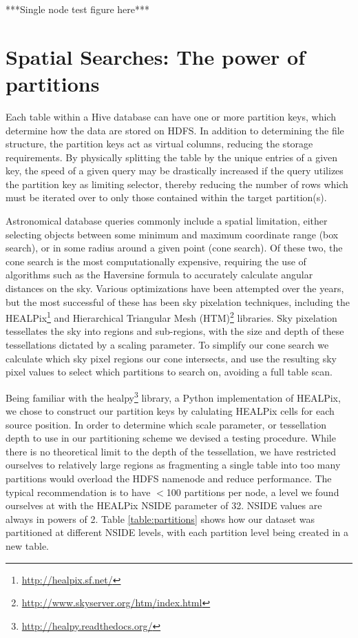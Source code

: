 \documentclass[11pt,twoside]{article}
\begin{document}
***Single node test figure here***

\section{Spatial Searches: The power of partitions}
\label{spatial}
Each table within a Hive database can have one or more partition keys, which determine how the data are stored on HDFS.  In addition to determining the file structure, the partition keys act as virtual columns, reducing the storage requirements.  By physically splitting the table by the unique entries of a given key, the speed of a given query may be drastically increased if the query utilizes the partition key as limiting selector, thereby reducing the number of rows which must be iterated over to only those contained within the target partition(s).

Astronomical database queries commonly include a spatial limitation, either selecting objects between some minimum and maximum coordinate range (box search), or in some radius around a given point (cone search).  Of these two, the cone search is the most computationally expensive, requiring the use of algorithms such as the Haversine formula to accurately calculate angular distances on the sky.  Various optimizations have been attempted over the years, but the most successful of these has been sky pixelation techniques, including the HEALPix\footnote{\url{http://healpix.sf.net/}} and Hierarchical Triangular Mesh (HTM)\footnote{\url{http://www.skyserver.org/htm/index.html}} libraries.  Sky pixelation tessellates the sky into regions and sub-regions, with the size and depth of these tessellations dictated by a scaling parameter.  To simplify our cone search we calculate which sky pixel regions our cone intersects, and use the resulting sky pixel values to select which partitions to search on, avoiding a full table scan.

Being familiar with the healpy\footnote{\url{http://healpy.readthedocs.org/}} library, a Python implementation of HEALPix, we chose to construct our partition keys by calulating HEALPix cells for each source position.  In order to determine which scale parameter, or tessellation depth to use in our partitioning scheme we devised a testing procedure.  While there is no theoretical limit to the depth of the tessellation, we have restricted ourselves to relatively large regions as fragmenting a single table into too many partitions would overload the HDFS namenode and reduce performance.  The typical recommendation is to have $<$100 partitions per node, a level we found ourselves at with the HEALPix NSIDE parameter of 32.  NSIDE values are always in powers of 2.  Table \ref{table:partitions} shows how our dataset was partitioned at different NSIDE levels, with each partition level being created in a new table.
\end{document}

